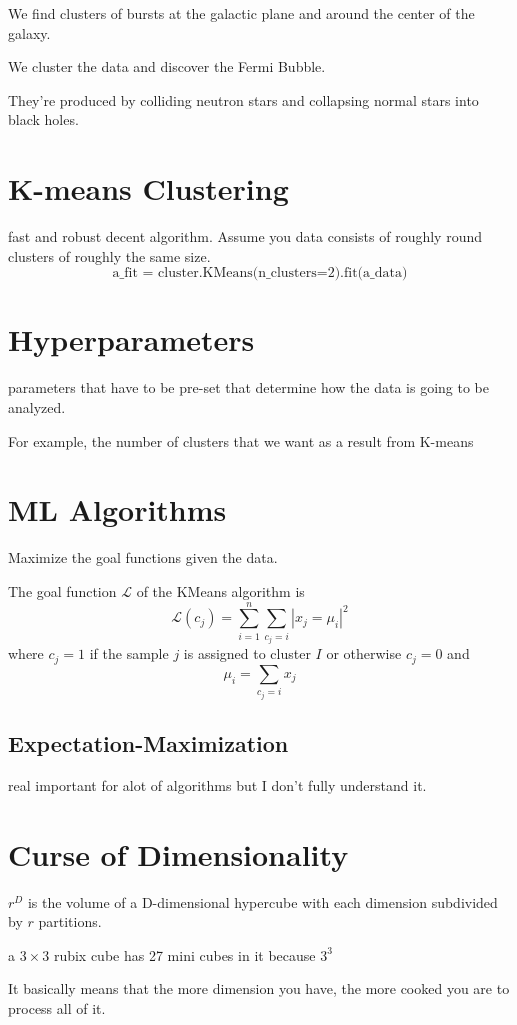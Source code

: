 \documentclass[fleqn]{report}
\begin{document}
We find clusters of bursts at the galactic plane and around the center of 
the galaxy. 

We cluster the data and discover the Fermi Bubble. 

They're produced by colliding neutron stars and collapsing normal stars 
into black holes. 

\section{K-means Clustering}
fast and robust decent algorithm. Assume you data consists of roughly 
round clusters of roughly the same size. 
\[
\textrm{
a\_fit = cluster.KMeans(n\_clusters=2).fit(a\_data)
}
\]

\section{Hyperparameters}
parameters that have to be pre-set that determine how the data is going 
to be analyzed. 

For example, the number of clusters that we want as a result from K-means 

\section{ML Algorithms}
Maximize the goal functions given the data. 

The goal function $\mathcal L$ of the KMeans algorithm is 
\[
\mathcal L(c_j) = \sum^n_{i = 1} \sum_{c_j = i} |x_j = \mu_i|^2
\]
where $c_j = 1$ if the sample $j$ is assigned to cluster $I$ or otherwise 
$c_j = 0$ and 
\[
\mu_i = \sum_{c_j = i} x_j
\]

\subsection{Expectation-Maximization}
real important for alot of algorithms but I don't fully understand it. 

\section{Curse of Dimensionality}
$r^D$ is the volume of a D-dimensional hypercube with each dimension subdivided 
by $r$ partitions. 

a $3 \times 3$ rubix cube has 27 mini cubes in it because $3^3$

It basically means that the more dimension you have, the more cooked you are to process all of it. 
\end{document}
